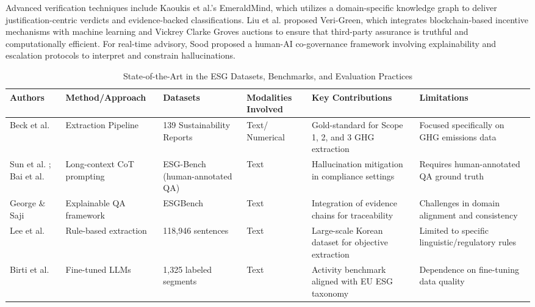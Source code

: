 Advanced verification techniques include Kaoukis et al.’s  \parencite{kaoukis__georgios_35bab107} EmeraldMind, which utilizes a domain-specific knowledge graph to deliver justification-centric verdicts and evidence-backed classifications. Liu et al.  \parencite{liyuan_liu_91c36432} proposed Veri-Green, which integrates blockchain-based incentive mechanisms with machine learning and Vickrey Clarke Groves auctions to ensure that third-party assurance is truthful and computationally efficient. For real-time advisory, Sood  \parencite{rohit_sood_cb3a4ead} proposed a human-AI co-governance framework involving explainability and escalation protocols to interpret and constrain hallucinations.



\begin{landscape}
\begin{table}[p]
\centering
\caption{State-of-the-Art in the ESG Datasets, Benchmarks, and Evaluation Practices}
\label{tab:esg-datasets-benchmarks-evaluation-practices}
\small
\renewcommand{\arraystretch}{1.2}
\begin{tabularx}{\linewidth}{|p{1.8cm}|X|X|p{1.8cm}|X|X|}
\hline
Authors & Method/Approach & Datasets & Modalities Involved & Key Contributions & Limitations \\ \hline
Beck et al.  \parencite{jacob_beck_9548a833} & Extraction Pipeline & 139 Sustainability Reports & Text/ Numerical & Gold-standard for Scope 1, 2, and 3 GHG extraction & Focused specifically on GHG emissions data \\ \hline
Sun et al.  \parencite{siqi_sun_f6a51152}; Bai et al.  \parencite{association_for_artificial_intelligence_2026_86e12eae} & Long-context CoT prompting & ESG-Bench (human-annotated QA) & Text & Hallucination mitigation in compliance settings & Requires human-annotated QA ground truth \\ \hline
George \& Saji  \parencite{s__s__george_saji_b30d4b3e} & Explainable QA framework & ESGBench & Text & Integration of evidence chains for traceability & Challenges in domain alignment and consistency \\ \hline
Lee et al.  \parencite{jaeyoung_lee_1894333c} & Rule-based extraction & 118,946 sentences & Text & Large-scale Korean dataset for objective extraction & Limited to specific linguistic/regulatory rules \\ \hline
Birti et al.  \parencite{mattia_birti_c097e3e8} & Fine-tuned LLMs & 1,325 labeled segments & Text & Activity benchmark aligned with EU ESG taxonomy & Dependence on fine-tuning data quality \\ \hline

\end{tabularx}
\end{table}
\end{landscape}

